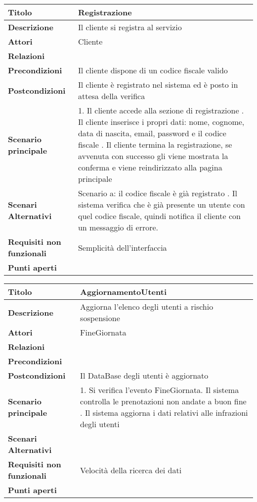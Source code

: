 \begin{tabular} {|P{4.5cm}|P{12.5cm}|}
  \hline
    \textbf{Titolo} & Registrazione\\
  \hline
    \textbf{Descrizione} & Il cliente si registra al servizio\\
  \hline
    \textbf{Attori} & Cliente\\
  \hline
    \textbf{Relazioni} &\\
  \hline
  \textbf{Precondizioni} & Il cliente dispone di un codice fiscale valido\\
  \hline
    \textbf{Postcondizioni} & Il cliente è registrato nel sistema ed è posto in attesa della verifica\\
  \hline
    \textbf{Scenario principale} & 1. Il cliente accede alla sezione di registrazione . Il cliente inserisce i propri dati: nome, cognome, data di nascita, email, password e il codice fiscale . Il cliente termina la registrazione, se avvenuta con successo gli viene mostrata la conferma e viene reindirizzato alla pagina principale\\
  \hline
    \textbf{Scenari Alternativi} & Scenario a: il codice fiscale è già registrato . Il sistema verifica che è già presente un utente con quel codice fiscale, quindi notifica il cliente con un messaggio di errore.\\
  \hline
    \textbf{Requisiti non funzionali} & Semplicità dell'interfaccia\\
  \hline
    \textbf{Punti aperti} &\\
  \hline
\end{tabular}
\hfill
\break

\begin{tabular} {|P{4.5cm}|P{12.5cm}|}
\hline
  \textbf{Titolo} & AggiornamentoUtenti\\
\hline
  \textbf{Descrizione} & Aggiorna l'elenco degli utenti a rischio sospensione\\
\hline
  \textbf{Attori} & FineGiornata\\
\hline
  \textbf{Relazioni} &\\
\hline
  \textbf{Precondizioni} &\\
\hline
  \textbf{Postcondizioni} & Il DataBase degli utenti è aggiornato\\
\hline
  \textbf{Scenario principale} & 1. Si verifica l'evento FineGiornata. Il sistema controlla le prenotazioni non andate a buon fine . Il sistema aggiorna i dati relativi alle infrazioni degli utenti\\
\hline
  \textbf{Scenari Alternativi} &\\
\hline
  \textbf{Requisiti non funzionali} & Velocità della ricerca dei dati\\
\hline
  \textbf{Punti aperti} &\\
\hline
\end{tabular}
\hfill
\break

